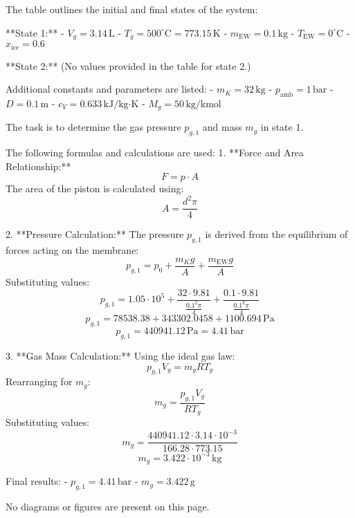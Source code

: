 The table outlines the initial and final states of the system:  

**State 1:**  
- \( V_g = 3.14 \, \text{L} \)  
- \( T_g = 500^\circ\text{C} = 773.15 \, \text{K} \)  
- \( m_{\text{EW}} = 0.1 \, \text{kg} \)  
- \( T_{\text{EW}} = 0^\circ\text{C} \)  
- \( x_{\text{ice}} = 0.6 \)  

**State 2:**  
(No values provided in the table for state 2.)  

Additional constants and parameters are listed:  
- \( m_K = 32 \, \text{kg} \)  
- \( p_{\text{amb}} = 1 \, \text{bar} \)  
- \( D = 0.1 \, \text{m} \)  
- \( c_V = 0.633 \, \text{kJ/kg·K} \)  
- \( M_g = 50 \, \text{kg/kmol} \)  

The task is to determine the gas pressure \( p_{g,1} \) and mass \( m_g \) in state 1.  

The following formulas and calculations are used:  
1. **Force and Area Relationship:**  
   \[ F = p \cdot A \]  
   The area of the piston is calculated using:  
   \[ A = \frac{d^2 \pi}{4} \]  

2. **Pressure Calculation:**  
   The pressure \( p_{g,1} \) is derived from the equilibrium of forces acting on the membrane:  
   \[ p_{g,1} = p_0 + \frac{m_K g}{A} + \frac{m_{\text{EW}} g}{A} \]  
   Substituting values:  
   \[ p_{g,1} = 1.05 \cdot 10^5 + \frac{32 \cdot 9.81}{\frac{0.1^2 \pi}{4}} + \frac{0.1 \cdot 9.81}{\frac{0.1^2 \pi}{4}} \]  
   \[ p_{g,1} = 78538.38 + 343302.0458 + 1100.694 \, \text{Pa} \]  
   \[ p_{g,1} = 440941.12 \, \text{Pa} = 4.41 \, \text{bar} \]  

3. **Gas Mass Calculation:**  
   Using the ideal gas law:  
   \[ p_{g,1} V_g = m_g R T_g \]  
   Rearranging for \( m_g \):  
   \[ m_g = \frac{p_{g,1} V_g}{R T_g} \]  
   Substituting values:  
   \[ m_g = \frac{440941.12 \cdot 3.14 \cdot 10^{-3}}{166.28 \cdot 773.15} \]  
   \[ m_g = 3.422 \cdot 10^{-3} \, \text{kg} \]  

Final results:  
- \( p_{g,1} = 4.41 \, \text{bar} \)  
- \( m_g = 3.422 \, \text{g} \)  

No diagrams or figures are present on this page.